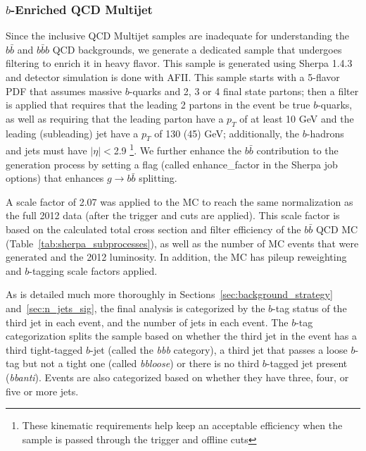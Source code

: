 \subsubsection{$b$-Enriched QCD Multijet}
\label{sec:bb_qcd_mc}
Since the inclusive QCD Multijet samples are inadequate for understanding the $b\bar{b}$ and 
$b\bar{b}b$ QCD backgrounds, we generate a dedicated sample that undergoes filtering to 
enrich it in heavy flavor.  This sample is generated using Sherpa 1.4.3 
\cite{Sherpa} and detector simulation is done with AFII.  This sample 
starts with a 5-flavor PDF that assumes massive $b$-quarks and 
2, 3 or 4 final state partons; then a filter is applied that 
requires that the leading 2 partons in the event be true $b$-quarks, 
as well as requiring that the leading parton have a $p_T$ 
of at least 10 GeV and the leading (subleading) jet have a $p_T$ of
130 (45) GeV; additionally, the $b$-hadrons and jets must have $|\eta|<$2.9 
\footnote{These kinematic requirements help keep an acceptable efficiency when 
the sample is passed through the trigger and offline cuts}.  We further enhance
the $b\bar{b}$ contribution to the generation process by setting a flag (called enhance\_factor
in the Sherpa job options) that enhances $g\rightarrow b\bar{b}$ splitting.

A scale factor of 2.07 was applied to the MC to  
reach the same normalization as the full 2012 data (after the trigger and cuts are 
applied).  This scale factor is based on the calculated total cross section and
filter efficiency of the $b\bar{b}$ QCD MC (Table~\ref{tab:sherpa_subprocesses}), as well
as the number of MC events that were generated and the 2012 luminosity. 
In addition, the MC has pileup reweighting and $b$-tagging scale factors
applied.  

As is detailed much more thoroughly in Sections~\ref{sec:background_strategy}
and~\ref{sec:n_jets_sig}, the final analysis is categorized by the $b$-tag
status of the third jet in each event, and the number of jets in each event.
The $b$-tag categorization splits the sample based on whether the third jet 
in the event has a third tight-tagged $b$-jet (called the \textit{bbb} category),
a third jet that passes a loose $b$-tag but not a tight one (called \textit{bbloose})
or there is no third $b$-tagged jet present (\textit{bbanti}).  Events are
also categorized based on whether they have three, four, or five or more jets.

